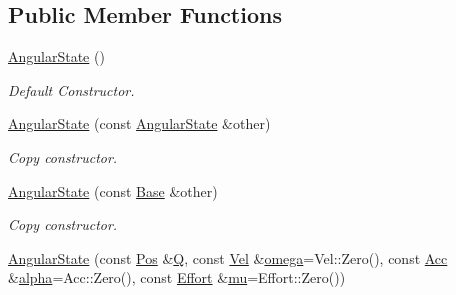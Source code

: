 \subsection*{Public Member Functions}
\begin{DoxyCompactItemize}
\item 
\hyperlink{classow__core_1_1AngularState_aa682ec4497b3bb4ef2b629e39527e2bb}{Angular\+State} ()\hypertarget{classow__core_1_1AngularState_aa682ec4497b3bb4ef2b629e39527e2bb}{}\label{classow__core_1_1AngularState_aa682ec4497b3bb4ef2b629e39527e2bb}

\begin{DoxyCompactList}\small\item\em Default Constructor. \end{DoxyCompactList}\item 
\hyperlink{classow__core_1_1AngularState_a5191c49903820db9b49006be791f1ffb}{Angular\+State} (const \hyperlink{classow__core_1_1AngularState}{Angular\+State} \&other)\hypertarget{classow__core_1_1AngularState_a5191c49903820db9b49006be791f1ffb}{}\label{classow__core_1_1AngularState_a5191c49903820db9b49006be791f1ffb}

\begin{DoxyCompactList}\small\item\em Copy constructor. \end{DoxyCompactList}\item 
\hyperlink{classow__core_1_1AngularState_a0266dd4c998ae1806d22d12eb8afe832}{Angular\+State} (const \hyperlink{classow__core_1_1StateBase}{Base} \&other)\hypertarget{classow__core_1_1AngularState_a0266dd4c998ae1806d22d12eb8afe832}{}\label{classow__core_1_1AngularState_a0266dd4c998ae1806d22d12eb8afe832}

\begin{DoxyCompactList}\small\item\em Copy constructor. \end{DoxyCompactList}\item 
\hyperlink{classow__core_1_1AngularState_a160e231823c6284c66a60532f7cf7407}{Angular\+State} (const \hyperlink{classow__core_1_1AngularPosition}{Pos} \&\hyperlink{classow__core_1_1AngularState_ab1e5f74baf6c53c76e4252ad81b46c0a}{Q}, const \hyperlink{classow__core_1_1AngularVelocity}{Vel} \&\hyperlink{classow__core_1_1AngularState_a3a91694bff829ed084afa4565b279304}{omega}=Vel\+::\+Zero(), const \hyperlink{classow__core_1_1AngularAcceleration}{Acc} \&\hyperlink{classow__core_1_1AngularState_a45003fc8663b4ddfdb8eea709b8cc086}{alpha}=Acc\+::\+Zero(), const \hyperlink{classow__core_1_1Moment}{Effort} \&\hyperlink{classow__core_1_1AngularState_a0f6539347a50088c7188faf28c284e83}{mu}=Effort\+::\+Zero())\hypertarget{classow__core_1_1AngularState_a160e231823c6284c66a60532f7cf7407}{}\label{classow__core_1_1AngularState_a160e231823c6284c66a60532f7cf7407}


\end{DoxyCompactItemize}
